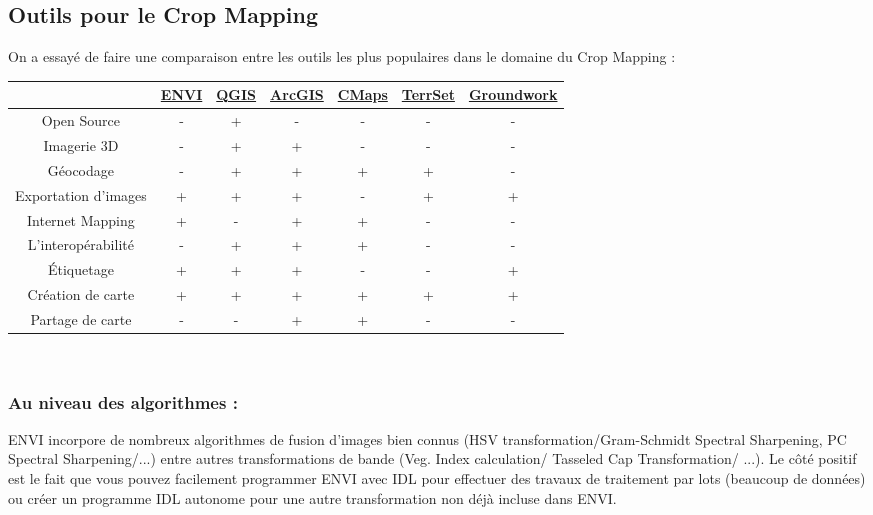 \documentclass[12pt, openany]{report}
\begin{document}
\subsection{Outils pour le Crop Mapping}

On a essayé de faire une comparaison entre les outils les plus populaires dans le domaine du Crop Mapping :

{\setlength{\tabulinesep}{3pt}
\begin{tabu}{|c|c|c|c|c|c|c|}
\hline
{}&\href{https://www.harrisgeospatial.com/Software-Technology/ENVI}{ENVI}&\href{https://groundwork.azavea.com}{QGIS}&\href{https://www.arcgis.com/index.html}{ArcGIS}&\href{https://cmapsconnect.com/}{CMaps}&\href{https://clarklabs.org/terrset/}{TerrSet}&\href{https://groundwork.azavea.com/}{Groundwork}\\
\hline
Open Source & - & + & - & - & - & -\\
\hline
Imagerie 3D & - & + & + & - & - & -\\
\hline
Géocodage & - & + & + & + & + & -\\
\hline
Exportation d'images & + & + & + & - & + & +\\
\hline
Internet Mapping & + & - & + & + & - & -\\
\hline
L'interopérabilité & - & + & + & + & - & -\\
\hline
Étiquetage & + & + & + & - & - & +\\
\hline
Création de carte & + & + & + & + & + & +\\
\hline
Partage de carte & - & - & + & + & - & -\\
\hline
\end{tabu}}\\


\subsubsection{Au niveau des algorithmes :}


ENVI incorpore de nombreux algorithmes de fusion d'images bien connus (HSV transformation/Gram-Schmidt Spectral Sharpening, PC Spectral Sharpening/...) entre autres transformations de bande (Veg. Index calculation/ Tasseled Cap Transformation/ ...). Le côté positif est le fait que vous pouvez facilement programmer ENVI avec IDL pour effectuer des travaux de traitement par lots (beaucoup de données) ou créer un programme IDL autonome pour une autre transformation non déjà incluse dans ENVI.\\
\end{document}
